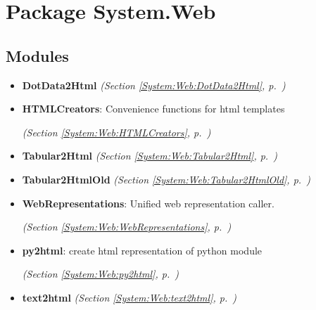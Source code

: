 %
%
%


\section{Package System.Web}

    \label{System:Web}


\subsection{Modules}

\begin{itemize}
\setlength{\parskip}{0ex}
\item \textbf{DotData2Html}
  \textit{(Section \ref{System:Web:DotData2Html}, p.~\pageref{System:Web:DotData2Html})}

\item \textbf{HTMLCreators}: Convenience functions for html templates



  \textit{(Section \ref{System:Web:HTMLCreators}, p.~\pageref{System:Web:HTMLCreators})}

\item \textbf{Tabular2Html}
  \textit{(Section \ref{System:Web:Tabular2Html}, p.~\pageref{System:Web:Tabular2Html})}

\item \textbf{Tabular2HtmlOld}
  \textit{(Section \ref{System:Web:Tabular2HtmlOld}, p.~\pageref{System:Web:Tabular2HtmlOld})}

\item \textbf{WebRepresentations}: Unified web representation caller.



  \textit{(Section \ref{System:Web:WebRepresentations}, p.~\pageref{System:Web:WebRepresentations})}

\item \textbf{py2html}: create html representation of python module



  \textit{(Section \ref{System:Web:py2html}, p.~\pageref{System:Web:py2html})}

\item \textbf{text2html}
  \textit{(Section \ref{System:Web:text2html}, p.~\pageref{System:Web:text2html})}

\end{itemize}


